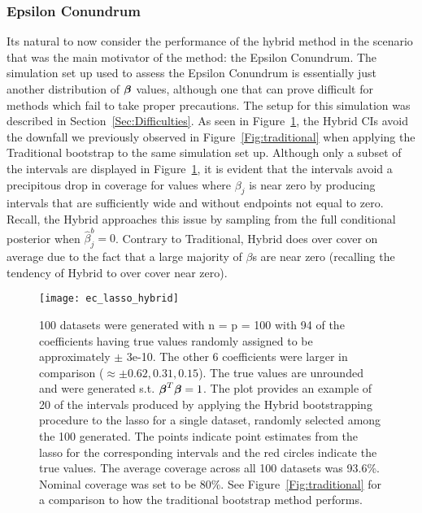 \subsubsection{Epsilon Conundrum}\label{Sec:Epsilon}


Its natural to now consider the performance of the hybrid method in the scenario that was the main motivator of the method: the Epsilon Conundrum. The simulation set up used to assess the Epsilon Conundrum is essentially just another distribution of $\boldsymbol{\beta}$ values, although one that can prove difficult for methods which fail to take proper precautions. The setup for this simulation was described in Section~\ref{Sec:Difficulties}. As seen in Figure~\ref{Fig:zerosample2}, the Hybrid CIs avoid the downfall we previously observed in Figure~\ref{Fig:traditional} when applying the Traditional bootstrap to the same simulation set up. Although only a subset of the intervals are displayed in Figure~\ref{Fig:zerosample2}, it is evident that the intervals avoid a precipitous drop in coverage for values where $\beta_j$ is near zero by producing intervals that are sufficiently wide and without endpoints not equal to zero. Recall, the Hybrid approaches this issue by sampling from the full conditional posterior when $\hat{\beta}_j^b = 0$. Contrary to Traditional, Hybrid does over cover on average due to the fact that a large majority of $\beta$s are near zero (recalling the tendency of Hybrid to over cover near zero). 


\begin{figure}[hbtp]
  \begin{center}
  \texttt{[image: ec\_lasso\_hybrid]}
  \caption{\label{Fig:zerosample2} 100 datasets were generated with n = p = 100 with 94 of the coefficients having true values randomly assigned to be approximately $\pm$ 3e-10. The other 6 coefficients were larger in comparison ($\approx \pm 0.62, 0.31, 0.15$). The true values are unrounded and were generated s.t. $\boldsymbol{\beta}^T\boldsymbol{\beta} = 1$. The plot provides an example of 20 of the intervals produced by applying the Hybrid bootstrapping procedure to the lasso for a single dataset, randomly selected among the 100 generated. The points indicate point estimates from the lasso for the corresponding intervals and the red circles indicate the true values. The average coverage across all 100 datasets was 93.6\%. Nominal coverage was set to be 80\%. See Figure~\ref{Fig:traditional} for a comparison to how the traditional bootstrap method performs.}
  \end{center}
\end{figure}


